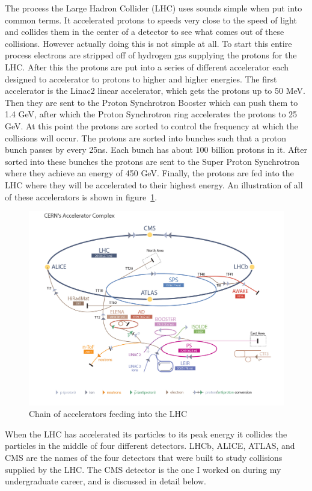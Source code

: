 The process the Large Hadron Collider (LHC) uses sounds simple when put into common terms. It accelerated protons to speeds very close to the speed of light and collides them in the center of a detector to see what comes out of these collisions. However actually doing this is not simple at all. To start this entire process electrons are stripped off of hydrogen gas supplying the protons for the LHC. After this the protons are put into a series of different accelerator each designed to accelerator to protons to higher and higher energies. The first accelerator is the Linac2 linear accelerator, which gets the protons up to 50 MeV. Then they are sent to the Proton Synchrotron Booster which can push them to 1.4 GeV, after which the Proton Synchrotron ring accelerates the protons to 25 GeV. At this point the protons are sorted to control the frequency at which the collisions will occur. The protons are sorted into bunches such that a proton bunch passes by every 25ns. Each bunch has about 100 billion protons in it. After sorted into these bunches the protons are sent to the Super Proton Synchrotron where they achieve an energy of 450 GeV. Finally, the protons are fed into the LHC where they will be accelerated to their highest energy. An illustration of all of these accelerators is shown in figure~\ref{fig:acceleratorcomplex}.

\begin{figure}
\centering
\includegraphics[width=0.8\linewidth]{Figures/acceleratorcomplex.jpg}
\caption{Chain of accelerators feeding into the LHC}
\label{fig:acceleratorcomplex}
\end{figure}

When the LHC has accelerated its particles to its peak energy it collides the particles in the middle of four different detectors. LHCb, ALICE, ATLAS, and CMS are the names of the four detectors that were built to study collisions supplied by the LHC. The CMS detector is the one I worked on during my undergraduate career, and is discussed in detail below.

